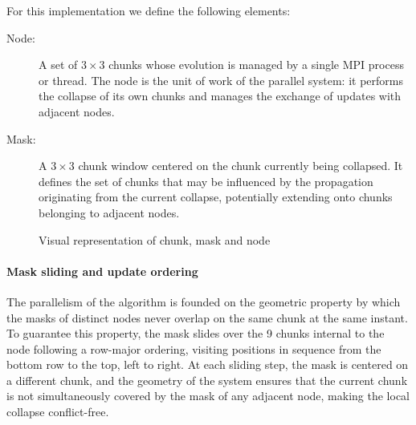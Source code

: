 For this implementation we define the following elements:

\begin{description}
    \item[Node:] A set of $3 \times 3$ chunks whose evolution is managed by a
    single MPI process or thread. The node is the unit of work of the parallel
    system: it performs the collapse of its own chunks and manages the exchange
    of updates with adjacent nodes.

    \item[Mask:] A $3 \times 3$ chunk window centered on the chunk currently
    being collapsed. It defines the set of chunks that may be influenced by the
    propagation originating from the current collapse, potentially extending onto
    chunks belonging to adjacent nodes.
\end{description}
\begin{figure}[ht]
\centering
{}
\caption{Visual representation of chunk, mask and node}
\label{fig:uno}
\end{figure}

\paragraph{Mask sliding and update ordering}
The parallelism of the algorithm is founded on the geometric property by which
the masks of distinct nodes never overlap on the same chunk at the same instant.
To guarantee this property, the mask slides over the 9 chunks internal to the
node following a row-major ordering, visiting positions in sequence from the
bottom row to the top, left to right. At each sliding step, the mask is centered
on a different chunk, and the geometry of the system ensures that the current
chunk is not simultaneously covered by the mask of any adjacent node, making
the local collapse conflict-free.

